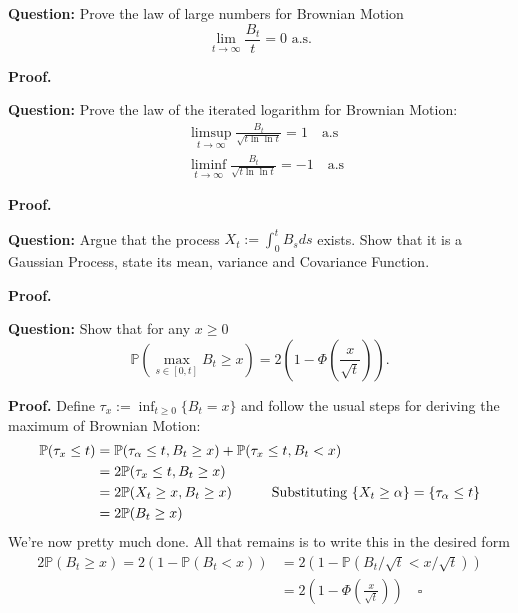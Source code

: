 \documentclass{article}
\begin{document}
\begin{tcolorbox}[colframe=black,colback=gray!5,boxrule=0.5pt]
\textbf{Question:} Prove the law of large numbers for Brownian Motion
$$\lim_{t\to\infty}\frac{B_t}{t} = 0 \text{ a.s.}$$
\end{tcolorbox}
\textbf{Proof.}

\begin{tcolorbox}[colframe=black,colback=gray!5,boxrule=0.5pt]
\textbf{Question:} Prove the law of the iterated logarithm for Brownian Motion:
\begin{align*}
    & \limsup_{t\to\infty}\frac{B_t}{\sqrt{t\ln\ln t}}=1\quad \text{a.s} \\
    & \liminf_{t\to\infty}\frac{B_t}{\sqrt{t\ln\ln t}}=-1\quad \text{a.s}
\end{align*}
\end{tcolorbox}
\textbf{Proof.}

\begin{tcolorbox}[colframe=black,colback=gray!5,boxrule=0.5pt]
\textbf{Question:} Argue that the process $X_t := \int_0^t B_sds$ exists. Show that it is a Gaussian Process, state its mean, variance and Covariance Function.
\end{tcolorbox}
\textbf{Proof.}


\begin{tcolorbox}[colframe=black,colback=gray!5,boxrule=0.5pt]
\textbf{Question:} Show that for any $x\geq 0$ 
$$\mathbb{P}(\max_{s\in[0,t]} B_t\geq x) = 2\left(1- \Phi\left(\frac{x}{\sqrt{t}}\right)\right).$$
\end{tcolorbox}
\textbf{Proof.} Define $\tau_x := \inf_{t\geq0}\{B_t=x\}$ and follow the usual steps for deriving the maximum of Brownian Motion: 
\begin{align*}
    \mathbb{P}(\tau_x \leq t) &= \mathbb{P}(\tau_\alpha\leq t, B_t \geq x) + \mathbb{P}(\tau_x\leq t, B_t < x) \\
    &= 2\mathbb{P}(\tau_x\leq t, B_t \geq x) \\
    &= 2\mathbb{P}(X_t\geq x, B_t\geq x) \hspace{10mm}\text{{Substituting $\{X_t\geq\alpha\} = \{\tau_\alpha \leq t\}$}} \\
    &= 2\mathbb{P}(B_t\geq x) \\
\end{align*}
We're now pretty much done. All that remains is to write this in the desired form
\begin{align*}
    2\mathbb{P}(B_t\geq x) = 2(1 - \mathbb{P}(B_t <x))  &= 2(1 - \mathbb{P}(B_t/\sqrt{t} <x/\sqrt{t})) \\
    &= 2\left(1- \Phi\left(\frac{x}{\sqrt{t}}\right)\right) \quad\square
\end{align*}
\end{document}
